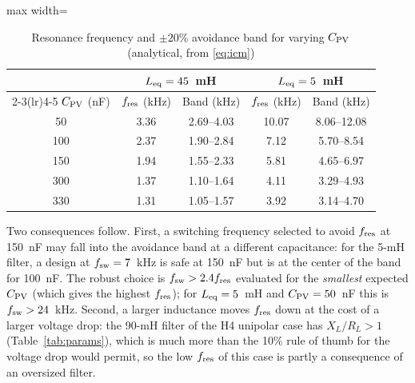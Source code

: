 \begin{table}[!t]
\renewcommand{\arraystretch}{1.2}
\caption{Resonance frequency and $\pm20\%$ avoidance band for varying $C_{\mathrm{PV}}$ (analytical, from \eqref{eq:icm})}
\label{tab:sens}
\centering
\footnotesize
\begin{adjustbox}{max width=\columnwidth}
\begin{tabular}{ccccc}
\toprule
 & \multicolumn{2}{c}{$L_{\mathrm{eq}}=45$~mH} & \multicolumn{2}{c}{$L_{\mathrm{eq}}=5$~mH} \\
\cmidrule(lr){2-3}\cmidrule(lr){4-5}
$C_{\mathrm{PV}}$ (nF) & $f_{\mathrm{res}}$ (kHz) & Band (kHz) & $f_{\mathrm{res}}$ (kHz) & Band (kHz) \\
\midrule
50  & 3.36 & 2.69--4.03 & 10.07 & 8.06--12.08 \\
100 & 2.37 & 1.90--2.84 & 7.12  & 5.70--8.54 \\
150 & 1.94 & 1.55--2.33 & 5.81  & 4.65--6.97 \\
300 & 1.37 & 1.10--1.64 & 4.11  & 3.29--4.93 \\
330 & 1.31 & 1.05--1.57 & 3.92  & 3.14--4.70 \\
\bottomrule
\end{tabular}
\end{adjustbox}
\end{table}

Two consequences follow. First, a switching frequency selected to avoid $f_{\mathrm{res}}$ at 150~nF may fall into the avoidance band at a different capacitance: for the 5-mH filter, a design at $f_{\mathrm{sw}}=7$~kHz is safe at 150~nF but is at the center of the band for 100~nF. The robust choice is $f_{\mathrm{sw}}>2.4f_{\mathrm{res}}$ evaluated for the \emph{smallest} expected $C_{\mathrm{PV}}$ (which gives the highest $f_{\mathrm{res}}$); for $L_{\mathrm{eq}}=5$~mH and $C_{\mathrm{PV}}=50$~nF this is $f_{\mathrm{sw}}>24$~kHz. Second, a larger inductance moves $f_{\mathrm{res}}$ down at the cost of a larger voltage drop: the 90-mH filter of the H4 unipolar case has $X_L/R_L>1$ (Table~\ref{tab:params}), which is much more than the 10\% rule of thumb for the voltage drop would permit, so the low $f_{\mathrm{res}}$ of this case is partly a consequence of an oversized filter.

